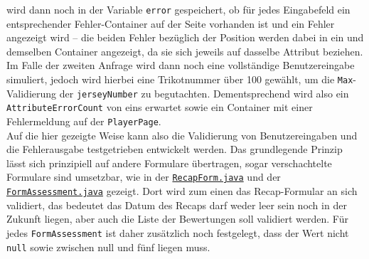 wird dann noch in der Variable \texttt{error} gespeichert, ob für jedes Eingabefeld 
ein entsprechender Fehler-Container auf der Seite vorhanden ist und ein Fehler 
angezeigt wird -- die beiden Fehler bezüglich der Position werden dabei in ein und 
demselben Container angezeigt, da sie sich jeweils auf dasselbe Attribut 
beziehen. \\ 
Im Falle der zweiten Anfrage wird dann noch eine vollständige Benutzereingabe 
simuliert, jedoch wird hierbei eine Trikotnummer über 100 gewählt, um die 
\texttt{Max}-Validierung der \texttt{jerseyNumber} zu begutachten. Dementsprechend 
wird also ein \texttt{AttributeErrorCount} von eins erwartet sowie ein Container 
mit einer Fehlermeldung auf der \texttt{PlayerPage}. \\ 
Auf die hier gezeigte Weise kann also die Validierung von Benutzereingaben und die 
Fehlerausgabe testgetrieben entwickelt werden. Das grundlegende Prinzip lässt sich 
prinzipiell auf andere Formulare übertragen, sogar verschachtelte Formulare sind 
umsetzbar, wie in der 
\href{https://github.com/FlorianOhmes/bat_spielzeitenplaner/blob/main/spielzeitenplaner/src/main/java/de/bathesis/spielzeitenplaner/web/forms/RecapForm.java}{\texttt{RecapForm.java}} 
und der 
\href{https://github.com/FlorianOhmes/bat_spielzeitenplaner/blob/main/spielzeitenplaner/src/main/java/de/bathesis/spielzeitenplaner/web/forms/FormAssessment.java}{\texttt{FormAssessment.java}} 
gezeigt. Dort wird zum einen das Recap-Formular an sich validiert, das bedeutet 
das Datum des Recaps darf weder leer sein noch in der Zukunft liegen, aber auch 
die Liste der Bewertungen soll validiert werden. Für jedes \texttt{FormAssessment} 
ist daher zusätzlich noch festgelegt, dass der Wert nicht \texttt{null} sowie 
zwischen null und fünf liegen muss. 

